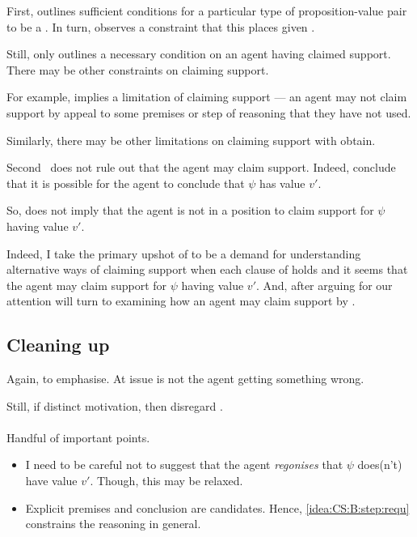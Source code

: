 \begin{note}
  First, \LCS{} outlines sufficient conditions for a particular type of proposition-value pair to be a \crequ{}.
  In turn, \FCS{} observes a constraint that this places given \ideaCS{}.

  Still, \ideaCS{} only outlines a necessary condition on an agent having claimed support.
  There may be other constraints on claiming support.

  For example, \ESU{} implies a limitation of claiming support --- an agent may not claim support by appeal to some premises or step of reasoning that they have not used.

  Similarly, there may be other limitations on claiming support with obtain.
\end{note}

\begin{note}
  Second~\FCS{} does not rule out that the agent may claim support.
  Indeed, conclude that it is possible for the agent to conclude that \(\psi\) has value \(v'\).

  So, \nI{} does not imply that the agent is not in a position to claim support for \(\psi\) having value \(v'\).

  \color{red}
  Indeed, I take the primary upshot of \nI{} to be a demand for understanding alternative ways of claiming support when each clause of \nI{} holds and it seems that the agent may claim support for \(\psi\) having value \(v'\).
  And, after arguing for \nI{} our attention will turn to examining how an agent may claim support by \EAS{}.
\end{note}

\subsection{Cleaning up}
\label{sec:cleaning-up}

\begin{note}
  Again, to emphasise.
  At issue is not the agent getting something wrong.

  Still, if distinct motivation, then disregard \ideaS{}.
\end{note}

\paragraph{\ideaCS{}}

\begin{note}
  Handful of important points.
  \begin{itemize}
  \item I need to be careful not to suggest that the agent \emph{regonises} that \(\psi\) does(n't) have value \(v'\).
    Though, this may be relaxed.
  \item Explicit premises and conclusion are candidates.
  Hence, \ref{idea:CS:B:step:requ} constrains the reasoning in general.
  \end{itemize}
\end{note}

